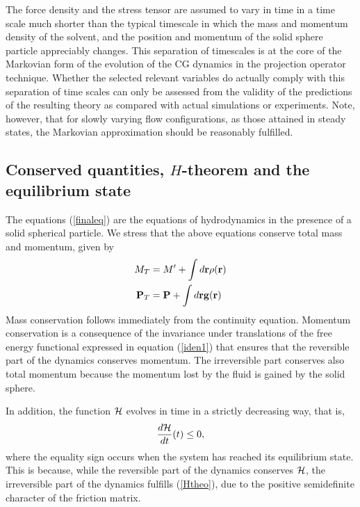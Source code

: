 \documentclass[b5paper,openright,10pt]{book}
\begin{document}
The force density and the stress tensor are assumed to vary in time in
a time  scale much shorter  than the typical  timescale in  which the
mass  and  momentum density  of  the  solvent,  and the  position  and
momentum  of  the solid  sphere  particle  appreciably changes.   This
separation of timescales is at the  core of the Markovian form of the
evolution   of   the   CG   dynamics  in   the   projection   operator
technique. Whether the selected  relevant variables do actually comply
with  this separation  of time  scales can  only be  assessed from  the
validity of the  predictions of the resulting theory  as compared with
actual   simulations  or   experiments.   Note,   however,  that   for
slowly varying flow  configurations, as  those attained  in steady
states, the Markovian approximation should be reasonably fulfilled.

\subsection{Conserved quantities, $H$-theorem and the equilibrium state}
The equations  (\ref{finaleq}) are the equations  of hydrodynamics in
the  presence of  a solid  spherical particle.  We
stress  that  the  above  equations conserve  total  mass  and
momentum, given by
\begin{align}
  M_T&=M'+\int d{\bf r}\rho({\bf r})
\nonumber\\
{\bf P}_T&={\bf P}+\int d{\bf r}{\bf g}({\bf r})
\end{align}
Mass conservation  follows immediately  from the  continuity equation.
Momentum  conservation  is  a  consequence  of  the  invariance  under
translations   of   the   free    energy   functional   expressed   in
equation  (\ref{iden1})  that  ensures  that the  reversible  part  of  the
dynamics  conserves momentum.   The irreversible  part conserves  also
total  momentum because  the
momentum lost by the fluid is gained by the solid sphere.

In  addition, the  function ${\cal H}$  evolves in time  in a
strictly decreasing way, that is,
\begin{align}
  \frac{d{\cal H}}{dt}(t)\le 0,
\label{Htheo}\end{align}
where  the  equality sign  occurs  when  the  system has  reached  its
equilibrium state.  This  is because, while the reversible  part of the
dynamics conserves  ${\cal H}$,  the irreversible part  of the
dynamics  fulfills  (\ref{Htheo}), due  to  the positive  semidefinite
character of  the friction matrix.  
\end{document}
